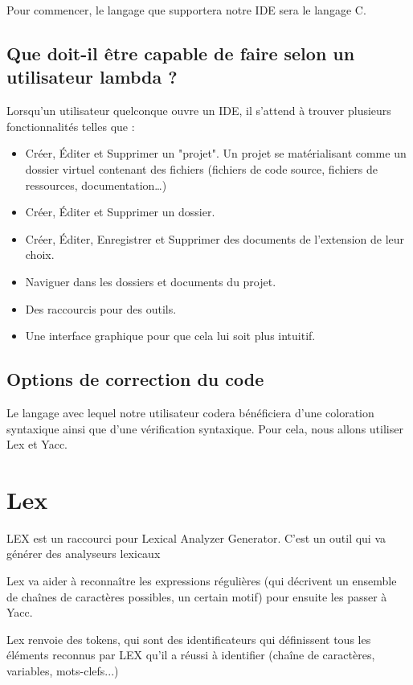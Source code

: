 \documentclass[a4paper,12pt]{article}
\begin{document}
Pour commencer, le langage que supportera notre IDE sera le langage C.

\subsection{Que doit-il être capable de faire selon un utilisateur lambda ?}

Lorsqu'un utilisateur quelconque  ouvre un IDE, il  s'attend à trouver
plusieurs fonctionnalités telles que :

\begin{itemize}
\item  Créer,   Éditer  et  Supprimer   un  "projet".  Un   projet  se
  matérialisant  comme  un  dossier  virtuel  contenant  des  fichiers
  (fichiers    de    code     source,    fichiers    de    ressources,
  documentation\dots)
\item Créer, Éditer et Supprimer un dossier.
\item  Créer,  Éditer,  Enregistrer  et  Supprimer  des  documents  de
  l'extension de leur choix.
\item Naviguer dans les dossiers et documents du projet.
\item Des raccourcis pour des outils.
\item Une interface graphique pour que cela lui soit plus intuitif.
\end{itemize}

\subsection{Options de correction du code}

Le  langage avec  lequel  notre utilisateur  codera bénéficiera  d'une
coloration syntaxique  ainsi que  d'une vérification  syntaxique. Pour
cela, nous allons utiliser Lex et Yacc.

\section{Lex}

LEX est un raccourci pour Lexical Analyzer Generator. C'est un outil qui va générer des analyseurs lexicaux 

Lex va aider à reconnaître les expressions régulières (qui décrivent un ensemble de chaînes de caractères possibles, un certain motif) pour ensuite les passer à Yacc.

Lex renvoie des tokens, qui sont des identificateurs qui définissent tous les éléments reconnus par LEX qu'il a réussi à identifier (chaîne de caractères, variables, mots-clefs...)
\end{document}
